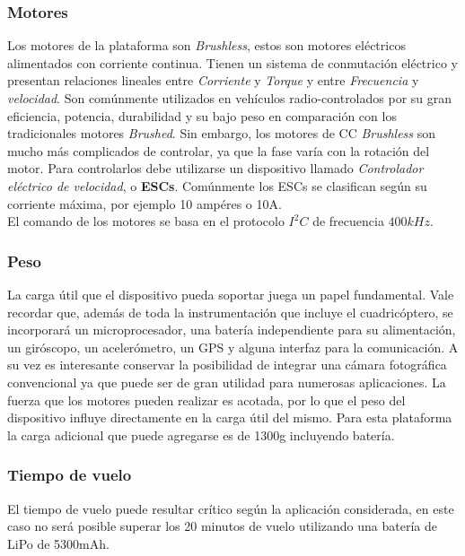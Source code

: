 \documentclass[main]{subfiles}
\begin{document}
 
\subsubsection*{Motores}
Los motores de la plataforma son \emph{Brushless}, estos son motores el\'ectricos alimentados con corriente continua. Tienen un sistema de conmutaci\'on el\'ectrico y presentan relaciones lineales entre \emph{Corriente} y \emph{Torque} y entre \emph{Frecuencia} y \emph{velocidad}. Son com\'unmente utilizados en veh\'iculos radio-controlados por su gran eficiencia, potencia, durabilidad y su bajo peso en comparaci\'on con los tradicionales motores \emph{Brushed}. Sin embargo, los motores de CC \emph{Brushless} son mucho m\'as complicados de controlar, ya que la fase var\'ia con la rotaci\'on del motor. Para controlarlos debe utilizarse un dispositivo llamado \emph{Controlador el\'ectrico de velocidad}, o \textbf{ESCs}. Com\'unmente los ESCs se clasifican seg\'un su corriente m\'axima, por ejemplo 10 amp\'eres o 10A.\\

El comando de los motores se basa en el protocolo $I^2C$ de frecuencia $400kHz$.  

\subsubsection*{Peso}

	La carga \'util que el dispositivo pueda soportar juega un papel fundamental. Vale recordar que, adem\'as de toda la instrumentaci\'on que incluye el cuadric\'optero, se incorporar\'a un microprocesador, una bater\'ia independiente para su alimentaci\'on, un gir\'oscopo, un aceler\'ometro, un GPS y alguna interfaz para la comunicaci\'on. A su vez es interesante conservar la posibilidad de integrar una c\'amara fotogr\'afica convencional ya que puede ser de gran utilidad para numerosas aplicaciones. La fuerza que los motores pueden realizar es acotada, por lo que el peso del dispositivo influye directamente en la carga \'util del mismo. Para esta plataforma la carga adicional que puede agregarse es de 1300g incluyendo bater\'ia. 

\subsubsection*{Tiempo de vuelo}

El tiempo de vuelo puede resultar cr\'itico seg\'un la aplicaci\'on considerada, en este caso no ser\'a posible superar los 20 minutos de vuelo utilizando una bater\'ia de LiPo de 5300mAh. 
\end{document}
